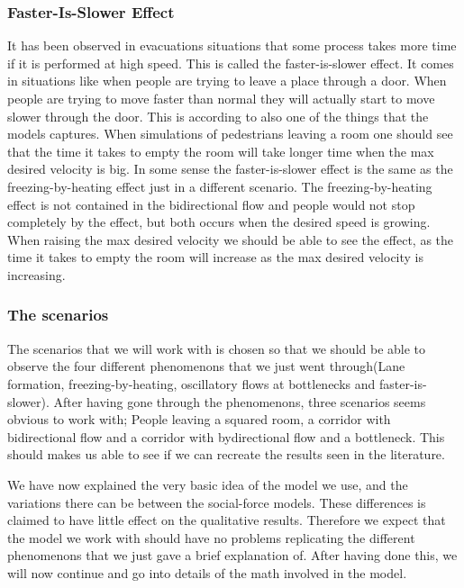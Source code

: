 \subsubsection{Faster-Is-Slower Effect}
It has been observed in evacuations situations that some process takes more
time if it is performed at high speed. This is called the faster-is-slower effect. It comes
in situations like when people are trying to leave a place through a door. When people are
trying to move faster than normal they will actually start to move slower through the door.
This is according to \cite{self-org} also one of the things that the models captures. When simulations
of pedestrians leaving a room one should see that the time it takes to empty the room will take longer time
when the max desired velocity is big. In some sense the faster-is-slower effect is the same as the
freezing-by-heating effect just in a different scenario. The freezing-by-heating effect is not contained
in the bidirectional flow and people would not stop completely by the effect,
but both occurs when the desired speed is growing.
When raising the max desired velocity we should be able to see the effect, as the time it takes to
empty the room will increase as the max desired velocity is increasing.

\subsubsection{The scenarios}
The scenarios that we will work with is chosen so that we should be able to observe the four
different phenomenons that we just went through(Lane formation, freezing-by-heating, oscillatory
flows at bottlenecks and faster-is-slower).
After having gone through the phenomenons, three scenarios seems obvious to work with;
People leaving a squared room, a corridor with bidirectional flow
and a corridor with bydirectional flow and a bottleneck.
This should makes us able to see if we can recreate the results seen in the literature.

We have now explained the very basic idea of the model we use, and the variations there can be between
the social-force models. These differences is claimed to have little effect on the qualitative results.
Therefore we expect that the model we work with should have no problems replicating the different phenomenons
that we just gave a brief explanation of. After having done this, we will now continue and go into
details of the math involved in the model.

